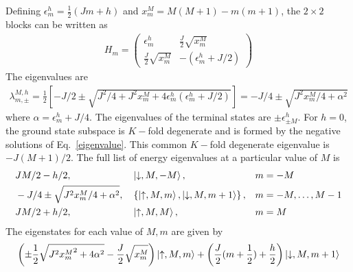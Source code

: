 \documentclass{revtex4-2}
\begin{document}
Defining \(\epsilon^h_m = \frac{1}{2}\left(Jm + h\right) \) and \(x^M_m = M(M+1) - m(m+1)\), the \(2\times 2\) blocks can be written as
\begin{align}
	H_m = \begin{pmatrix} \epsilon^h_m & \frac{J}{2}\sqrt{x^M_m} \\ \frac{J}{2}\sqrt{x^M_m} & -\left( \epsilon^h_m + J/2 \right)   \end{pmatrix} 
\end{align}
The eigenvalues are 
\begin{align}
	\label{eigenvalue}
	\lambda_{m, \pm}^{M, h} = \frac{1}{2}\left[-J/2 \pm \sqrt{J^2/4 + J^2 x_m^M + 4\epsilon^h_m\left(\epsilon^h_m + J/2\right) }\right] = -J/4 \pm \sqrt{J^2x^M_m/4 + \alpha^2}
\end{align}
where \(\alpha = \epsilon^h_m + J/4\).
The eigenvalues of the terminal states are \(\pm\epsilon^h_{\pm M}\). For \(h = 0\), the ground state subspace is \(K-\)fold degenerate and is formed by the negative solutions of Eq.~\ref{eigenvalue}. This common \(K-\)fold degenerate eigenvalue is \(-J(M+1)/2\).
The full list of energy eigenvalues at a particular value of \(M\) is
\begin{align}
\label{stargraph_spectrum}
&		JM/2 - h/2, &&\ket{\downarrow, M, -M}, && m = -M\\
&-J/4 \pm \sqrt{J^2x^M_m/4 + \alpha^2}, &&\left\{\ket{\uparrow, M, m}, \ket{\downarrow, M, m+1}\right\}, &&m=-M,\ldots,M-1\\
&JM/2 + h/2, &&\ket{\uparrow, M, M},&& m = M\\
\end{align}
The eigenstates for each value of \(M,m\) are given by
\begin{align}
	\left(\pm\frac{1}{2}\sqrt{J^2 {x_m^M}^2 + 4\alpha^2} - \frac{J}{2}\sqrt{x_m^M}\right)\ket{\uparrow, M, m} + \left(\frac{J}{2}(m+\frac{1}{2}) + \frac{h}{2}\right) \ket{\downarrow, M, m+1}
\end{align}
\end{document}

